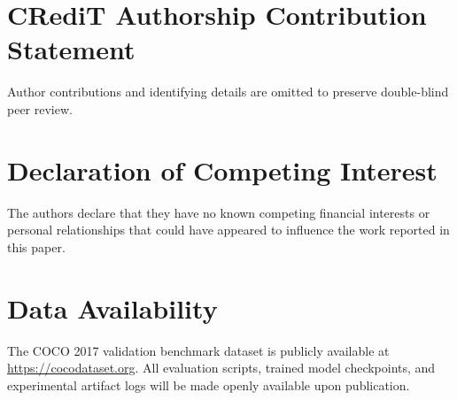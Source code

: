 \documentclass[preprint,12pt]{elsarticle}
\begin{document}
\section*{CRediT Authorship Contribution Statement}
Author contributions and identifying details are omitted to preserve double-blind peer review.

\section*{Declaration of Competing Interest}
The authors declare that they have no known competing financial interests or personal relationships that could have appeared to influence the work reported in this paper.

\section*{Data Availability}
The COCO 2017 validation benchmark dataset is publicly available at \url{https://cocodataset.org}. All evaluation scripts, trained model checkpoints, and experimental artifact logs will be made openly available upon publication.



\end{document}
